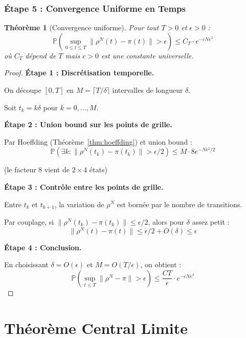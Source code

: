 \documentclass[11pt,a4paper]{article}
\theoremstyle{plain}
\newtheorem{theorem}{Théorème}[section]
\theoremstyle{definition}
\theoremstyle{remark}
\newcommand{\Prob}{\mathbb{P}}
\begin{document}
\section{Étape 5 : Convergence Uniforme en Temps}

\begin{theorem}[Convergence uniforme]\label{thm:uniform_convergence}
Pour tout $T > 0$ et $\epsilon > 0$ :
\[
\boxed{\Prob\left( \sup_{0 \leq t \leq T} \|\rho^N(t) - \pi(t)\| > \epsilon \right) \leq C_T \cdot e^{-cN\epsilon^2}}
\]
où $C_T$ dépend de $T$ mais $c > 0$ est une constante universelle.
\end{theorem}

\begin{proof}
\textbf{Étape 1 : Discrétisation temporelle.}

On découpe $[0, T]$ en $M = \lceil T/\delta \rceil$ intervalles de longueur $\delta$.

Soit $t_k = k\delta$ pour $k = 0, \ldots, M$.

\textbf{Étape 2 : Union bound sur les points de grille.}

Par Hoeffding (Théorème~\ref{thm:hoeffding}) et union bound :
\[
\Prob\left( \exists k : \|\rho^N(t_k) - \pi(t_k)\| > \epsilon/2 \right) \leq M \cdot 8 e^{-N\epsilon^2/2}
\]

(le facteur 8 vient de $2 \times 4$ états)

\textbf{Étape 3 : Contrôle entre les points de grille.}

Entre $t_k$ et $t_{k+1}$, la variation de $\rho^N$ est bornée par le nombre de transitions.

Par couplage, si $\|\rho^N(t_k) - \pi(t_k)\| \leq \epsilon/2$, alors pour $\delta$ assez petit :
\[
\|\rho^N(t) - \pi(t)\| \leq \epsilon/2 + O(\delta) \leq \epsilon
\]

\textbf{Étape 4 : Conclusion.}

En choisissant $\delta = O(\epsilon)$ et $M = O(T/\epsilon)$, on obtient :
\[
\Prob\left( \sup_{t \leq T} \|\rho^N - \pi\| > \epsilon \right) \leq \frac{CT}{\epsilon} \cdot e^{-cN\epsilon^2}
\]
\end{proof}

\part{Théorème Central Limite}
\end{document}
